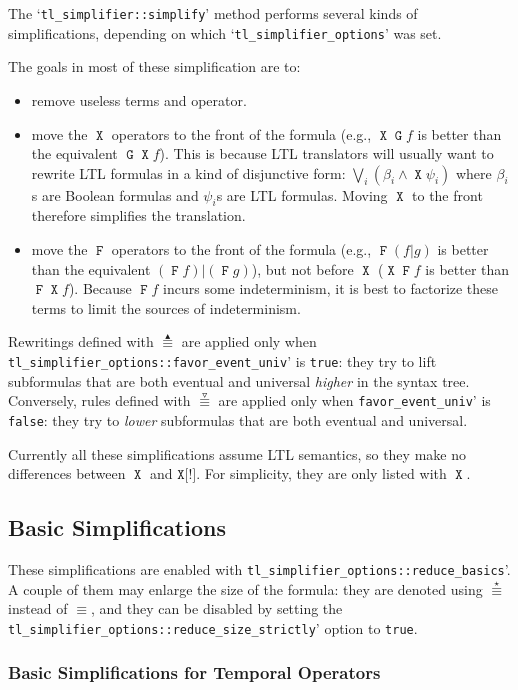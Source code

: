 \documentclass[a4paper,twoside,10pt,DIV=12]{scrreprt}
\DeclareMathOperator{\F}{\texttt{F}}
\DeclareMathOperator{\G}{\texttt{G}}
\DeclareMathOperator{\X}{\texttt{X}}
\newcommand{\StrongX}{\texttt{X[!]}}
\newcommand{\OR}{\mathbin{\texttt{|}}}
\newcommand{\0}{\texttt{0}}
\newcommand{\1}{\texttt{1}}
\newcommand{\equiV}{\stackrel{\star}{\equiv}}
\newcommand{\equivEU}{\stackrel{\blacktriangleup}{\equiv}}
\newcommand{\equivNeu}{\stackrel{\smalltriangledown}{\equiv}}
\begin{document}
The `\verb|tl_simplifier::simplify|' method performs several kinds of
simplifications, depending on which `\verb|tl_simplifier_options|'
was set.

The goals in most of these simplification are to:
\begin{itemize}
\item remove useless terms and operator.
\item move the $\X$ operators to the front of the formula (e.g., $\X\G
  f$ is better than the equivalent $\G\X f$).  This is because LTL
  translators will usually want to rewrite LTL formulas in
  a kind of disjunctive form: $\displaystyle\bigvee_i
  \left(\beta_i\land\X\psi_i\right)$ where $\beta_i$s are Boolean
  formulas and $\psi_i$s are LTL formulas.  Moving $\X$ to the
  front therefore simplifies the translation.
\item move the $\F$ operators to the front of the formula (e.g., $\F(f
  \OR g)$ is better than the equivalent $(\F f)\OR (\F g)$), but not
  before $\X$ ($\X\F f$ is better than $\F\X f$).  Because $\F f$
  incurs some indeterminism, it is best to factorize these terms to
  limit the sources of indeterminism.
\end{itemize}

Rewritings defined with $\equivEU$ are applied only when
\verb|tl_simplifier_options::favor_event_univ|' is \texttt{true}:
they try to lift subformulas that are both eventual and universal
\emph{higher} in the syntax tree.  Conversely, rules defined with $\equivNeu$
are applied only when \verb|favor_event_univ|' is \texttt{false}: they
try to \textit{lower} subformulas that are both eventual and universal.

Currently all these simplifications assume LTL semantics, so they make
no differences between $\X$ and $\StrongX$. For simplicity, they are
only listed with $\X$.

\subsection{Basic Simplifications}\label{sec:basic-simp}

These simplifications are enabled with
\verb|tl_simplifier_options::reduce_basics|'.  A couple of them may
enlarge the size of the formula: they are denoted using $\equiV$
instead of $\equiv$, and they can be disabled by setting the
\verb|tl_simplifier_options::reduce_size_strictly|' option to
\texttt{true}.

\subsubsection{Basic Simplifications for Temporal Operators}
\label{sec:basic-simp-ltl}
\end{document}
